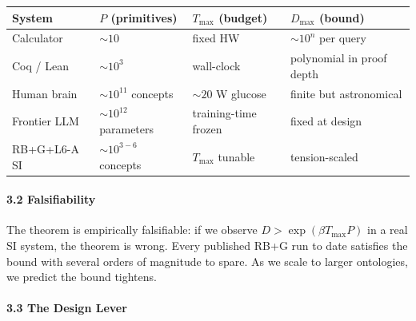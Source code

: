 \documentclass[
  11pt,
  a4paper,
]{article}
\begin{document}
\begin{longtable}[]{@{}
  >{\raggedright\arraybackslash}p{}
  >{\raggedright\arraybackslash}p{}
  >{\raggedright\arraybackslash}p{}
  >{\raggedright\arraybackslash}p{}@{}}
\toprule\noalign{}
\begin{minipage}[b]{\linewidth}\raggedright
System
\end{minipage} & \begin{minipage}[b]{\linewidth}\raggedright
\(P\) (primitives)
\end{minipage} & \begin{minipage}[b]{\linewidth}\raggedright
\(T_\text{max}\) (budget)
\end{minipage} & \begin{minipage}[b]{\linewidth}\raggedright
\(D_\text{max}\) (bound)
\end{minipage} \\
\midrule\noalign{}
\endhead
\bottomrule\noalign{}
\endlastfoot
Calculator & \(\sim 10\) & fixed HW & \(\sim 10^{n}\) per query \\
Coq / Lean & \(\sim 10^3\) & wall-clock & polynomial in proof depth \\
Human brain & \(\sim 10^{11}\) concepts & \(\sim 20\) W glucose & finite
but astronomical \\
Frontier LLM & \(\sim 10^{12}\) parameters & training-time frozen &
fixed at design \\
RB+G+L6-A SI & \(\sim 10^{3-6}\) concepts & \(T_\text{max}\) tunable &
tension-scaled \\
\end{longtable}

\paragraph{3.2 Falsifiability}\label{falsifiability}

The theorem is empirically falsifiable: if we observe
\(D > \exp(\beta T_\text{max} P)\) in a real SI system, the theorem is
wrong. Every published RB+G run to date satisfies the bound with several
orders of magnitude to spare. As we scale to larger ontologies, we
predict the bound tightens.

\paragraph{3.3 The Design Lever}\label{the-design-lever}
\end{document}
